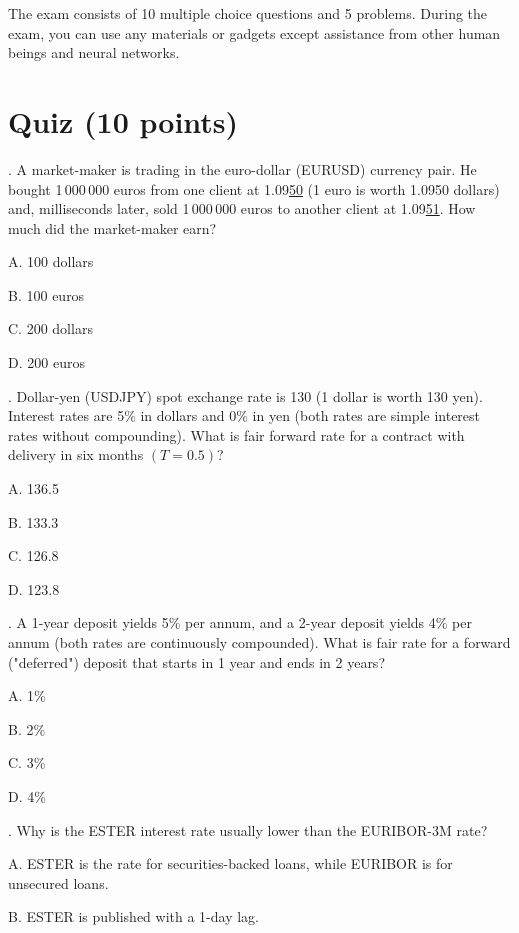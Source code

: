 \documentclass[a4paper,14pt]{extarticle}
\begin{document}
\noindent The exam consists of 10 multiple choice questions and 5 problems. During the exam, you can use any materials or gadgets except assistance from other human beings and neural networks.

\section{Quiz (10 points)}

. A market-maker is trading in the euro-dollar (EURUSD) currency pair. He bought 1\,000\,000 euros from one client at 1.09\underline{50} (1 euro is worth 1.0950 dollars) and, milliseconds later, sold 1\,000\,000 euros to another client at 1.09\underline{51}. How much did the market-maker earn?

A. 100 dollars

B. 100 euros

C. 200 dollars

D. 200 euros
 
\vspace{\baselineskip}

. Dollar-yen (USDJPY) spot exchange rate is 130 (1 dollar is worth 130 yen). Interest rates are 5\% in dollars and 0\% in yen (both rates are simple interest rates without compounding). What is fair forward rate for a contract with delivery in six months $(T=0.5)$?

A. 136.5

B. 133.3

C. 126.8

D. 123.8

\vspace{\baselineskip}

. A 1-year deposit yields 5\% per annum, and a 2-year deposit yields 4\% per annum (both rates are continuously compounded). What is fair rate for a forward ("deferred") deposit that starts in 1 year and ends in 2 years?

A. 1\%

B. 2\%

C. 3\%

D. 4\%

\vspace{\baselineskip}

. Why is the ESTER interest rate usually lower than the EURIBOR-3M rate?

A. ESTER is the rate for securities-backed loans, while EURIBOR is for unsecured loans.

B. ESTER is published with a 1-day lag.
\end{document}
